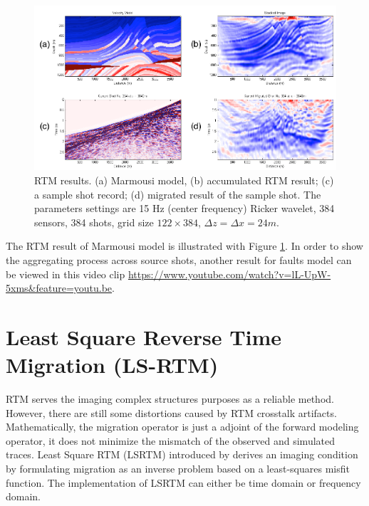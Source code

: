 \documentclass[11pt]{article}
\theoremstyle{plain}
\theoremstyle{definition}
\theoremstyle{remark}
\numberwithin{equation}{section}
\begin{document}
\begin{figure}[htbp]
\centering
\includegraphics[width=1\textwidth]{Fig/MarmousiRTM.pdf}
\caption{RTM results. (a) Marmousi model, (b) accumulated RTM result; (c) a sample shot record; (d) migrated result of the sample shot. The parameters settings are 15 Hz (center frequency) Ricker wavelet, 384 sensors, 384 shots, grid size $122 \times 384$, $\Delta z = \Delta x = 24m$.}
\label{fig:RTM}
\end{figure}

The RTM result of Marmousi model is illustrated with Figure \ref{fig:RTM}. In order to show the aggregating process across source shots, another result for faults model can be viewed in this video clip
\url{https://www.youtube.com/watch?v=lL-UpW-5xms&feature=youtu.be}.



\section{Least Square Reverse Time Migration (LS-RTM)}
RTM serves the imaging complex structures purposes as a reliable method. However, there are still some distortions caused by RTM crosstalk
artifacts. Mathematically, the migration operator is just a adjoint of the forward modeling operator, it does not minimize the mismatch of the observed and simulated traces. Least Square RTM (LSRTM) introduced by \cite{Nemeth:1999aa} derives an imaging condition by formulating migration as an inverse problem based on a least-squares misfit function. The implementation of LSRTM can either be time domain or frequency domain.
\end{document}

